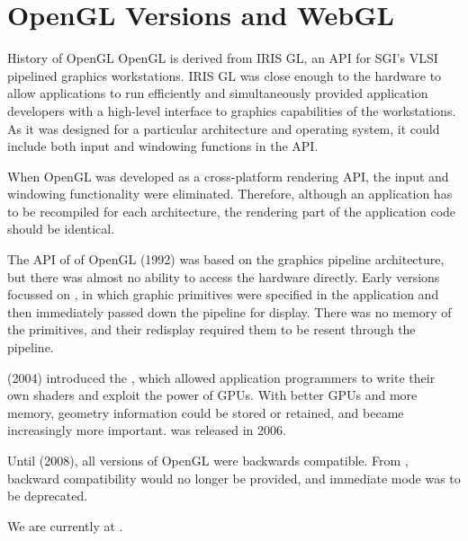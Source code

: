 \documentclass[\main/notes.tex]{subfiles}
\begin{document}
    \section{OpenGL Versions and WebGL}
      \begin{sidenote}{History of OpenGL}
        OpenGL is derived from IRIS GL,
        an API for SGI's VLSI pipelined graphics workstations.
        IRIS GL was close enough to the hardware to allow applications to run efficiently
        and simultaneously
        provided application developers with a high-level interface
        to graphics capabilities of the workstations.
        As it was designed for a particular architecture and operating system,
        it could include both input and windowing functions in the API.

        When OpenGL was developed as a cross-platform rendering API,
        the input and windowing functionality were eliminated.
        Therefore, although an application has to be recompiled for each architecture,
        the rendering part of the application code should be identical.

        The API of  of OpenGL (1992)
        was based on the graphics pipeline architecture,
        but there was almost no ability to access the hardware directly.
        Early versions focussed on ,
        in which graphic primitives were specified in the application
        and then immediately passed down the pipeline for display.
        There was no memory of the primitives,
        and their redisplay required them to be resent through the pipeline.

         (2004) introduced the ,
        which allowed application programmers to write their own shaders
        and exploit the power of GPUs.
        With better GPUs and more memory,
        geometry information could be stored or retained,
        and  became increasingly more important.
         was released in 2006.

        Until  (2008),
        all versions of OpenGL were backwards compatible.
        From ,
        backward compatibility would no longer be provided,
        and immediate mode was to be deprecated.

        We are currently at .
      \end{sidenote}
\end{document}
